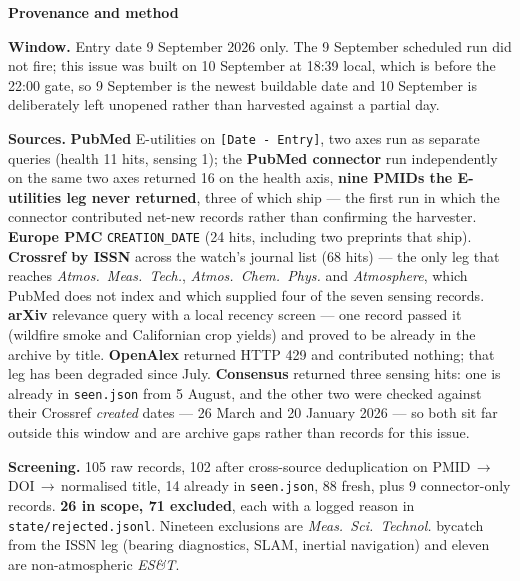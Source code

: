 \documentclass[10pt]{article}
\begin{document}
\vspace{4mm}
\begin{keybox}
{\sffamily\bfseries\footnotesize\color{Deep}Provenance and method}\\[1.2mm]
{\fontsize{7.2}{8.8}\selectfont
\textbf{Window.} Entry date 9 September 2026 only. The 9 September scheduled run did not
fire; this issue was built on 10 September at 18:39 local, which is before the 22:00 gate,
so 9 September is the newest buildable date and 10 September is deliberately left
unopened rather than harvested against a partial day.\par
\vspace{0.8mm}
\textbf{Sources.} \textbf{PubMed} E-utilities on \texttt{[Date - Entry]}, two axes run as
separate queries (health 11 hits, sensing 1); the \textbf{PubMed connector} run
independently on the same two axes returned 16 on the health axis, \textbf{nine PMIDs the
E-utilities leg never returned}, three of which ship --- the first run in which the
connector contributed net-new records rather than confirming the harvester.
\textbf{Europe PMC} \texttt{CREATION\_DATE} (24 hits, including two preprints that ship).
\textbf{Crossref by ISSN} across the watch's journal list (68 hits) --- the only leg that
reaches \textit{Atmos.\ Meas.\ Tech.}, \textit{Atmos.\ Chem.\ Phys.} and
\textit{Atmosphere}, which PubMed does not index and which supplied four of the seven
sensing records. \textbf{arXiv} relevance query with a local recency screen --- one record
passed it (wildfire smoke and Californian crop yields) and proved to be already in the
archive by title. \textbf{OpenAlex} returned HTTP 429 and contributed nothing; that leg has been
degraded since July. \textbf{Consensus} returned three sensing hits: one is already in
\texttt{seen.json} from 5 August, and the other two were checked against their Crossref
\emph{created} dates --- 26 March and 20 January 2026 --- so both sit far outside this
window and are archive gaps rather than records for this issue.\par
\vspace{0.8mm}
\textbf{Screening.} 105 raw records, 102 after cross-source deduplication on
PMID\,$\rightarrow$\,DOI\,$\rightarrow$\,normalised title, 14 already in
\texttt{seen.json}, 88 fresh, plus 9 connector-only records.
\textbf{26 in scope, 71 excluded}, each with a logged reason in
\texttt{state/rejected.jsonl}. Nineteen exclusions are \textit{Meas.\ Sci.\ Technol.}
bycatch from the ISSN leg (bearing diagnostics, SLAM, inertial navigation) and eleven are
non-atmospheric \textit{ES\&T}.\par
}
\end{keybox}
\end{document}
